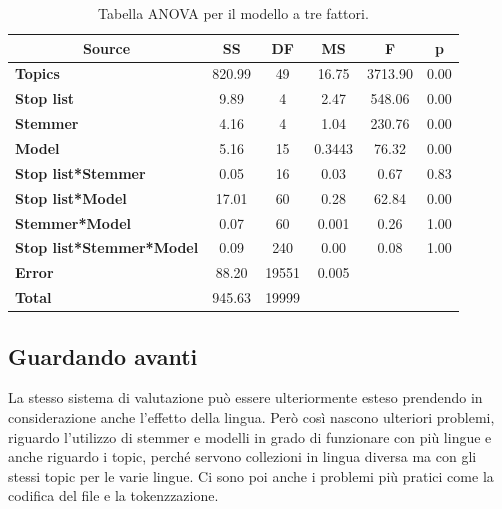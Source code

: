\begin{table}[htbp]
	\centering
	\begin{tabular}{|l|c|c|c|c|c|}
		\hline
		\multicolumn{1}{|c|}{\textbf{Source}} & \textbf{SS} & \textbf{DF} & \textbf{MS} & \textbf{F} & \textbf{p} \\ \hline
		\textbf{Topics}                       & 820.99      & 49          & 16.75       & 3713.90    & 0.00       \\ \hline
		\textbf{Stop list}                    & 9.89        & 4           & 2.47        & 548.06     & 0.00       \\ \hline
		\textbf{Stemmer}                      & 4.16        & 4           & 1.04        & 230.76     & 0.00       \\ \hline
		\textbf{Model}                        & 5.16        & 15          & 0.3443      & 76.32      & 0.00       \\ \hline
		\textbf{Stop list*Stemmer}            & 0.05        & 16          & 0.03        & 0.67       & 0.83       \\ \hline
		\textbf{Stop list*Model}              & 17.01       & 60          & 0.28        & 62.84      & 0.00       \\ \hline
		\textbf{Stemmer*Model}                & 0.07        & 60          & 0.001       & 0.26       & 1.00       \\ \hline
		\textbf{Stop list*Stemmer*Model}      & 0.09        & 240         & 0.00        & 0.08       & 1.00       \\ \hline
		\textbf{Error}                        & 88.20       & 19551       & 0.005       &            &            \\ \hline
		\textbf{Total}                        & 945.63      & 19999       &             &            &            \\ \hline
	\end{tabular}
	\caption{Tabella ANOVA per il modello a tre fattori.}\label{tab:anova-3}
\end{table}

\subsection{Guardando avanti}

La stesso sistema di valutazione può essere ulteriormente esteso prendendo in considerazione anche l'effetto della lingua.
Però così nascono ulteriori problemi, riguardo l'utilizzo di stemmer e modelli in grado di funzionare con più lingue e anche riguardo i topic, perché servono collezioni in lingua diversa ma con gli stessi topic per le varie lingue.
Ci sono poi anche i problemi più pratici come la codifica del file e la tokenzzazione.


